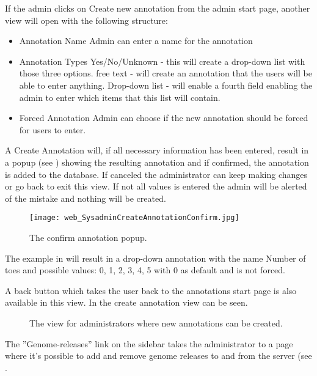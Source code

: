 If the admin clicks on Create new annotation from the admin start page, another view will open with the following structure:
\begin{itemize}
 \item Annotation Name
 \subitem Admin can enter a name for the annotation
 
 \item Annotation Types
 \subitem Yes/No/Unknown - this will create a drop-down list with those three options.
 \subitem free text - will create an annotation that the users will be able to enter anything.
 \subitem Drop-down list - will enable a fourth field enabling the admin to enter which items that this list will contain.
 
 \item Forced Annotation
 \subitem Admin can choose if the new annotation should be forced for users to enter. 
\end{itemize}

A Create Annotation will, if all necessary information has been entered, result in a popup (see ) showing the resulting annotation and if confirmed, the annotation is added to the database. 
If canceled the administrator can keep making changes or go back to exit this view. If not all values is entered the admin will be alerted of the mistake and nothing will be created.

\begin{figure}[h]
 \centering
 \texttt{[image: web\_SysadminCreateAnnotationConfirm.jpg]}
 \caption{The confirm annotation popup.}
 \label{adm_web_createPopup}
\end{figure}



The example in  will result in a drop-down annotation with the name Number of toes and possible values: 0, 1, 2, 3, 4, 5 with 0 as default and is not forced.

A back button which takes the user back to the annotations start page is also available in this view. In  the create annotation view can be seen.

\begin{figure}[t]
 \caption{The view for administrators where new annotations can be created.}
 \label{adm_web_createView}
\end{figure}

The ''Genome-releases'' link on the sidebar takes the administrator to a page where it's possible to add and remove genome releases to and from the server (see .

